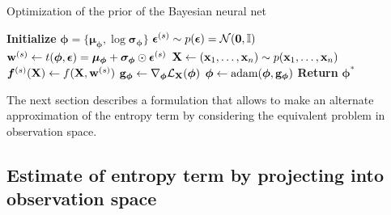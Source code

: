 \documentclass{article}
\begin{document}
\begin{algorithm}
\caption{Optimization of the prior of the Bayesian neural net}
\begin{algorithmic}[1]
\State \textbf{Initialize} $\bm \phi =\{ \bm \mu _{\bm \phi} , \log \bm \sigma _{\bm \phi}  \}$
    \State $ \bm \epsilon ^{(s)} \sim p(\bm \epsilon) = \mathcal{N} ( \mathbf{0} , \mathbb{I}) $
    \State $ \mathbf{w}  ^{(s)} \gets t (\bm \phi, \bm \epsilon) = 
    \bm \mu _{\bm \phi} + \bm \sigma _{\bm \phi}\odot  \bm \epsilon ^{(s)}$
    \State $ \mathbf{X}  \gets (  \mathbf{x} _1, \dots ,  \mathbf{x} _n) \sim p( \mathbf{x} _1, \dots ,  \mathbf{x} _n )$ 
    \State $\bm f ^{(s)}( \mathbf{X} ) \gets   f ( \mathbf{X}  ,  \mathbf{w} ^{(s)} )$ 
    \State   $\B g _{\bm \phi} \gets \nabla _{\bm \phi} \elbo _{\tiny \X} (\bm \phi ) $
    \State $\bm \phi \gets \text{adam}(\bm\phi ,  \mathbf{g}  _{\bm \phi} )$
\EndWhile
\State \textbf{Return} $\bm \phi^*$
\end{algorithmic}
\end{algorithm}

The next section describes a formulation that allows to 
make an alternate approximation of the entropy term by considering the equivalent problem 
in observation space.

\newpage
\subsection{Estimate of entropy term by projecting into observation space}
\end{document}
